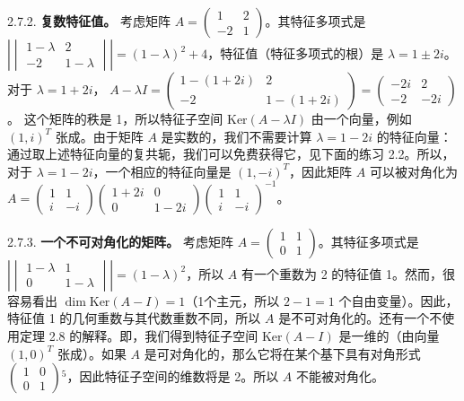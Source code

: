 2.7.2. \textbf{复数特征值。} 考虑矩阵 $A = \begin{pmatrix} 1 & 2 \\ -2 & 1 \end{pmatrix}$。其特征多项式是 $|\begin{vmatrix} 1-\lambda & 2 \\ -2 & 1-\lambda \end{vmatrix}| = (1-\lambda)^2 + 4$，特征值（特征多项式的根）是 $\lambda = 1 \pm 2i$。对于 $\lambda = 1 + 2i$， $A - \lambda I = \begin{pmatrix} 1-(1+2i) & 2 \\ -2 & 1-(1+2i) \end{pmatrix} = \begin{pmatrix} -2i & 2 \\ -2 & -2i \end{pmatrix}$。
这个矩阵的秩是 1，所以特征子空间 $\text{Ker}(A - \lambda I)$ 由一个向量，例如 $(1, i)^T$ 张成。由于矩阵 $A$ 是实数的，我们不需要计算 $\lambda = 1 - 2i$ 的特征向量：通过取上述特征向量的复共轭，我们可以免费获得它，见下面的练习 2.2。所以，对于 $\lambda = 1 - 2i$，一个相应的特征向量是 $(1, -i)^T$，因此矩阵 $A$ 可以被对角化为
$A = \begin{pmatrix} 1 & 1 \\ i & -i \end{pmatrix} \begin{pmatrix} 1+2i & 0 \\ 0 & 1-2i \end{pmatrix} \begin{pmatrix} 1 & 1 \\ i & -i \end{pmatrix}^{-1}$。

2.7.3. \textbf{一个不可对角化的矩阵。} 考虑矩阵 $A = \begin{pmatrix} 1 & 1 \\ 0 & 1 \end{pmatrix}$。其特征多项式是 $|\begin{vmatrix} 1-\lambda & 1 \\ 0 & 1-\lambda \end{vmatrix}| = (1-\lambda)^2$，所以 $A$ 有一个重数为 2 的特征值 1。然而，很容易看出 $\dim \text{Ker}(A - I) = 1$（1个主元，所以 $2-1=1$ 个自由变量）。因此，特征值 1 的几何重数与其代数重数不同，所以 $A$ 是不可对角化的。还有一个不使用定理 2.8 的解释。即，我们得到特征子空间 $\text{Ker}(A - I)$ 是一维的（由向量 $(1, 0)^T$ 张成）。如果 $A$ 是可对角化的，那么它将在某个基下具有对角形式 $\begin{pmatrix} 1 & 0 \\ 0 & 1 \end{pmatrix}$$^5$，因此特征子空间的维数将是 2。所以 $A$ 不能被对角化。

